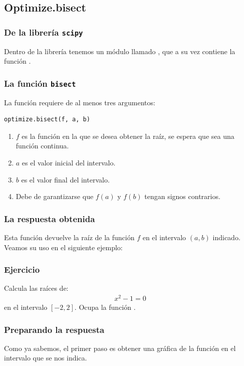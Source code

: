 \documentclass[12pt]{beamer}
\begin{document}
\subsection{Optimize.bisect}

\begin{frame}
\frametitle{De la librería \texttt{scipy}}
Dentro de la librería  tenemos un módulo llamado , que a su vez contiene la función .
\end{frame}
\begin{frame}[fragile]
\frametitle{La función \texttt{bisect}}
La función  requiere de al menos tres argumentos:
\pause
\begin{verbatim}
optimize.bisect(f, a, b)
\end{verbatim}
\pause
{}
\begin{enumerate}[<+->]
\item $f$ es la función en la que se desea obtener la raíz, se espera que sea una función continua.
\item $a$ es el valor inicial del intervalo.
\item $b$ es el valor final del intervalo.
\item Debe de garantizarse que $f (a)$ y $f (b)$ tengan signos contrarios.
\end{enumerate}
\end{frame}
\begin{frame}
\frametitle{La respuesta obtenida}
Esta función devuelve la raíz de la función $f$ en el intervalo $(a, b)$ indicado.
\\
\bigskip
\pause
Veamos su uso en el siguiente ejemplo:
\end{frame}
\begin{frame}
\frametitle{Ejercicio}
Calcula las raíces de:
\begin{align*}
x^{2} - 1 = 0
\end{align*}
en el intervalo $[-2, 2]$. Ocupa la función .
\end{frame}
\begin{frame}
\frametitle{Preparando la respuesta}
Como ya sabemos, el primer paso es obtener una gráfica de la función en el intervalo que se nos indica.
\end{frame}
\end{document}
